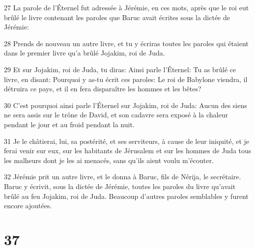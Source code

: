 \par 27 La parole de l'Éternel fut adressée à Jérémie, en ces mots, après que le roi eut brûlé le livre contenant les paroles que Baruc avait écrites sous la dictée de Jérémie:
\par 28 Prends de nouveau un autre livre, et tu y écriras toutes les paroles qui étaient dans le premier livre qu'a brûlé Jojakim, roi de Juda.
\par 29 Et sur Jojakim, roi de Juda, tu diras: Ainsi parle l'Éternel: Tu as brûlé ce livre, en disant: Pourquoi y as-tu écrit ces paroles: Le roi de Babylone viendra, il détruira ce pays, et il en fera disparaître les hommes et les bêtes?
\par 30 C'est pourquoi ainsi parle l'Éternel sur Jojakim, roi de Juda: Aucun des siens ne sera assis sur le trône de David, et son cadavre sera exposé à la chaleur pendant le jour et au froid pendant la nuit.
\par 31 Je le châtierai, lui, sa postérité, et ses serviteurs, à cause de leur iniquité, et je ferai venir sur eux, sur les habitants de Jérusalem et sur les hommes de Juda tous les malheurs dont je les ai menacés, sans qu'ils aient voulu m'écouter.
\par 32 Jérémie prit un autre livre, et le donna à Baruc, fils de Nérija, le secrétaire. Baruc y écrivit, sous la dictée de Jérémie, toutes les paroles du livre qu'avait brûlé au feu Jojakim, roi de Juda. Beaucoup d'autres paroles semblables y furent encore ajoutées.

\chapter{37}

